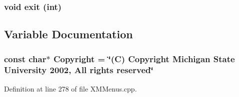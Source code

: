 \subsubsection{\setlength{\rightskip}{0pt plus 5cm}void exit (int)}\label{XMMenus_8cpp_a2}




\subsection{Variable Documentation}
\subsubsection{\setlength{\rightskip}{0pt plus 5cm}const char$\ast$ Copyright = \char`\"{}(C) Copyright Michigan State University 2002, All rights reserved\char`\"{}\hspace{0.3cm}{\tt  [static]}}\label{XMMenus_8cpp_a0}




Definition at line 278 of file XMMenus.cpp.